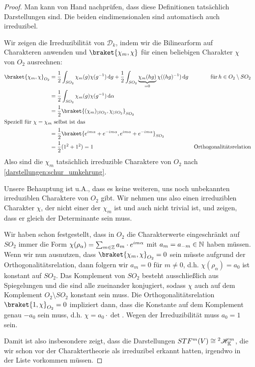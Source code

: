\begin{proof}
Man kann von Hand nachprüfen, dass diese Definitionen tatsächlich Darstellungen sind. Die beiden eindimensionalen sind automatisch auch irreduzibel.

Wir zeigen die Irreduzibilität von $\mathcal{D}_k$, indem wir die Bilinearform auf Charakteren anwenden und $\braket{\chi_m,\chi}$ für einen beliebigen Charakter $\chi$ von $O_2$ ausrechnen:
\begin{align*}
\braket{\chi_m,\chi}_{O_2} &= \frac{1}{2}\int_{SO_2} \chi_m(g)\chi(g^{-1}) \dd g + \frac{1}{2}\int_{SO_2} \underbrace{\chi_m(hg)}_{=0}\chi((hg)^{-1})\dd g &\text{für}\,h\in O_2\setminus SO_2\\
&= \frac{1}{2}\int_{SO_2} \chi_m(g)\chi(g^{-1}) \dd \alpha \\
&= \frac{1}{2} \braket{ (\chi_m)_{|SO_2} , \chi_{|SO_2}}_{SO_2} \\
\intertext{Speziell für $\chi=\chi_m$ selbst ist das}
&= \frac{1}{2} \braket{e^{im\alpha} + e^{-im\alpha}, e^{im\alpha} + e^{-im\alpha}}_{SO_2} \\
&=\frac{1}{2}(1^2 + 1^2)=1 &\text{Orthogonalitätsrelation}
\end{align*}
Also sind die $\chi_m$ tatsächlich irreduzible Charaktere von $O_2$ nach \ref{darstellungen:schur_umkehrung}.

\medbreak
Unsere Behauptung ist u.A., dass es keine weiteren, uns noch unbekannten irreduziblen Charaktere von $O_2$ gibt. Wir nehmen uns also einen irreduziblen Charakter $\chi$, der nicht einer der $\chi_m$ ist und auch nicht trivial ist, und zeigen, dass er gleich der Determinante sein muss.

\smallbreak
Wir haben schon festgestellt, dass in $O_2$ die Charakterwerte eingeschränkt auf $SO_2$ immer die Form $\chi(\rho_\alpha) = \sum_{m\in\mathbb{Z}} a_m\cdot  e^{im\alpha}$ mit $a_m=a_{-m}\in\mathbb{N}$ haben müssen. Wenn wir nun ausnutzen, dass $\braket{\chi_m,\chi}_{O_2}=0$ sein müsste aufgrund der Orthogonalitätsrelation, dann folgern wir $a_m=0$ für $m\neq 0$, d.h. $\chi(\rho_\alpha)=a_0$ ist konstant auf $SO_2$. Das Komplement von $SO_2$ besteht ausschließlich aus Spiegelungen und die sind alle zueinander konjugiert, sodass $\chi$ auch auf dem Komplement $O_2\setminus SO_2$ konstant sein muss. Die Orthogonalitätsrelation $\braket{1,\chi}_{O_2}=0$ impliziert dann, dass die Konstante auf dem Komplement genau $-a_0$ sein muss, d.h. $\chi = a_0\cdot \det$. Wegen der Irreduzibilität muss $a_0=1$ sein.

\medbreak
Damit ist also insbesondere zeigt, dass die Darstellungen $STF^m(V)\cong {^2}\mathscr{H}_{\mathbb{K}}^m$, die wir schon vor der Charaktertheorie als irreduzibel erkannt hatten, irgendwo in der Liste vorkommen müssen.


\end{proof}
